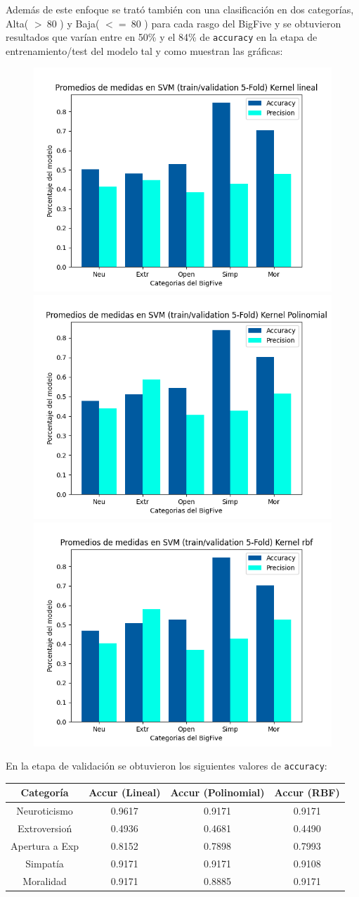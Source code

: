 \documentclass[10pt, a4paper]{article}
\begin{document}
            Adem\'as de este enfoque se trat\'o tambi\'en con una clasificaci\'on en dos categor\'ias, Alta( $>~ 80$ ) y Baja( $<= ~80$ ) para
            cada rasgo del BigFive y se obtuvieron resultados que var\'ian entre en 50\% y el 84\% de \texttt{accuracy} en la etapa 
            de entrenamiento/test del modelo tal y como muestran las gr\'aficas:\\ 

            \begin{figure}[h!]
                \centering
                \includegraphics[width = 0.3\linewidth]{Medias_Lineal.png}
                \includegraphics[width = 0.3\linewidth]{Medias_Polinomial.png}
                \includegraphics[width = 0.3\linewidth]{Medias_rbf.png}

            \end{figure}

            En la etapa de validaci\'on se obtuvieron los siguientes valores de \texttt{accuracy}: \\ 

            \begin{tabular}[h!]{|c|c|c|c|}

                \hline Categor\'ia & Accur (Lineal) & Accur (Polinomial) & Accur (RBF) \\  
                \hline Neuroticismo             & 0.9617 & 0.9171  &  0.9171\\
                \hline Extroversio\'n           & 0.4936 & 0.4681  &  0.4490\\
                \hline Apertura a Exp           & 0.8152 & 0.7898  &  0.7993\\
                \hline Simpat\'ia               & 0.9171 & 0.9171  &  0.9108\\
                \hline Moralidad                & 0.9171 & 0.8885  &  0.9171\\
                \hline
            \end{tabular}
\end{document}
